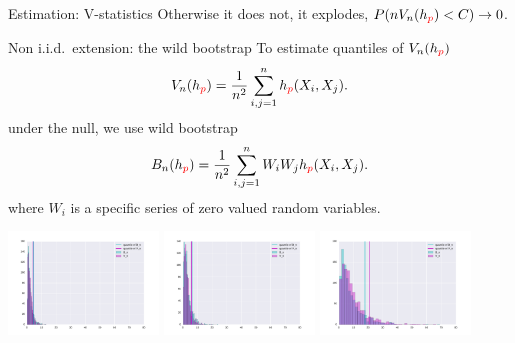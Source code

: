 \begin{frame}
\begin{columns}
\begin{column}{.33\linewidth}
\begin{block}{Estimation: V-statistics}
Otherwise it does not,  it explodes, $P(n V_n(h_{\color{red} p}) <C) \to 0$.
\end{block}
\vspace{-0.75cm}
\begin{block}{Non i.i.d.\ extension: the wild bootstrap}
To estimate quantiles of $ V_n(h_{\color{red} p})$  
\[
 V_n(h_{\color{red} p}) = \frac {1} {n^2} \sum_{i,j=1}^n h_{\color{red} p}(X_i,X_j).
\]
under the null, we use wild bootstrap
\[
 B_n(h_{\color{red} p}) = \frac {1} {n^2} \sum_{i,j=1}^n W_i W_j h_{\color{red} p}(X_i,X_j).
\]
  where $W_i$ is a specific series of zero valued random variables.


 \includegraphics[width=0.3\textwidth]{./img/bootstrapWorks1.pdf}
 \includegraphics[width=0.3\textwidth]{./img/bootstrapWorks4.pdf}
 \includegraphics[width=0.3\textwidth]{./img/bootstrapWorks8.pdf}
\end{block}
\end{column}



\end{columns}
\end{frame}
